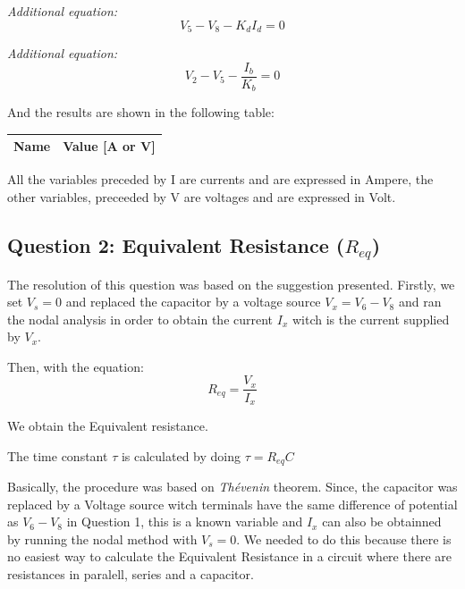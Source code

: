 \emph{Additional equation:}
\begin{equation}
     V_5 - V_8 - K_dI_d = 0
\end{equation}\par

\emph{Additional equation:}
\begin{equation}
     V_2 - V_5 - \frac{I_b}{K_b} = 0
\end{equation}\par

And the results are shown in the following table:

\begin{center}
  \begin{tabular}{ | c | c | }
    \hline    
    {\bf Name} & {\bf Value [A or V]} \\ \hline
    
    \hline
  \end{tabular}
\end{center}
All the variables preceded by I are currents and are expressed in Ampere, the other variables, preceeded by V are voltages and are expressed in Volt.



\subsection{Question 2: Equivalent Resistance ($R_{eq}$)}
The resolution of this question was based on the suggestion presented. Firstly, we set $V_s =0$ and replaced the capacitor by a voltage source $V_x = V_6 - V_8$ and ran the nodal analysis in order to obtain the current $I_x$ witch is the current supplied by $V_x$.\par
Then, with the equation: 
\begin{equation}
     R_{eq} = \frac{V_x}{I_x}
\end{equation}\par
We obtain the Equivalent resistance. \par 
The time constant $\tau$ is calculated by doing $\tau=R_{eq}C$\par
Basically, the procedure was based on \emph{Thévenin} theorem. Since, the capacitor was replaced by a Voltage source witch terminals have the same difference of potential as $V_6 - V_8$ in Question 1, this is a known variable and $I_x$ can also be obtainned by running the nodal method with $V_s = 0$. We needed to do this because there is no easiest way to calculate the Equivalent Resistance in a circuit where there are resistances in paralell, series and a capacitor.

